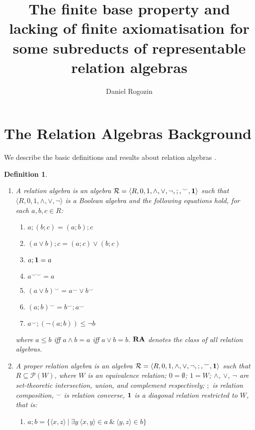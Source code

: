 \documentclass[a4paper]{article}
\author{Daniel Rogozin}
\date{}
\title{The finite base property and lacking of finite axiomatisation for some subreducts of representable relation algebras}
\theoremstyle{defin}
\newtheorem{defin}{Definition}
\theoremstyle{theorem}
\theoremstyle{prop}
\theoremstyle{lemma}
\theoremstyle{ex}
\theoremstyle{col}
\begin{document}
\maketitle

\nocite{*}

\section{The Relation Algebras Background}

We describe the basic definitions and results about relation algebras \cite{hirsch2002relation} \cite{maddux2006relation}.

\begin{defin}
  $ $

  \begin{enumerate}
    \item A relation algebra is an algebra $\mathcal{R} = \langle R, 0, 1, \wedge, \vee, \neg, ;, {}^{\smile}, {\bf 1 }\rangle$ such that $\langle R, 0, 1, \wedge, \vee, \neg \rangle$ is a Boolean algebra and the following
    equations hold, for each $a, b, c \in R$:
    \begin{enumerate}
      \item $a ; (b ; c) = (a ; b) ; c$
      \item $(a \vee b) ; c = (a ; c) \vee (b ; c)$
      \item $a ; {\bf 1} = a$
      \item $a^{\smile \smile} = a$
      \item $(a \vee b)^{\smile} = a^{\smile} \vee b^{\smile}$
      \item $(a ; b)^{\smile} = b^{\smile} ; a^{\smile}$
      \item $a^{\smile} ; (\neg (a ; b)) \leq \neg b$
    \end{enumerate}
    where $a \leq b$ iff $a \wedge b = a$ iff $a \vee b = b$. ${\bf RA}$ denotes the class of all relation
    algebras.
    \item A proper relation algebra is an algebra $\mathcal{R} = \langle R, 0, 1, \wedge, \vee, \neg, ;, {}^{\smile}, {\bf 1 }\rangle$ such that $R \subseteq \mathcal{P}(W)$, where $W$ is an equivalence relation; $0 = \emptyset$; $1 = W$; $\wedge$, $\vee$, $\neg$ are set-theoretic intersection, union, and
    complement respectively; $;$ is relation composition, ${}^{\smile}$ is relation converse, ${\bf 1}$ is a
    diagonal relation restricted to $W$, that is:
    \begin{enumerate}
    \item $a ; b = \{ \langle x, z \rangle \: | \: \exists y \: \langle x, y \rangle \in a \: \& \: \langle y, z \rangle \in b \}$

\end{enumerate}
\end{enumerate}
\end{defin}
\end{document}
